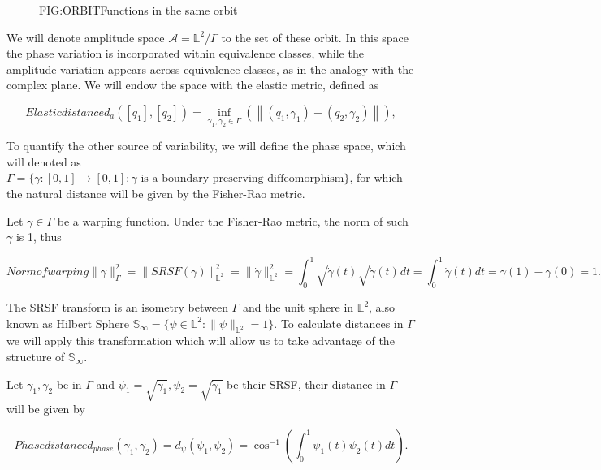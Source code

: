 \begin{figure}[Functions in the same orbit]{FIG:ORBIT}{Functions in the same orbit}
   \quad
\end{figure}

We will denote amplitude space $\mathscr{A}= \mathbb{L}^{2} / \Gamma$  to the
set of these orbit. In this space the phase variation is incorporated within
equivalence classes, while the amplitude variation appears across equivalence
classes, as in the analogy with the complex plane. We will endow the space with
the elastic metric, defined as

\begin{equation}[EQ:ELASTIC]{Elastic distance}
d_{a}\left(\left[q_{1}\right],\left[q_{2}\right]\right)=\inf _{
\gamma_{1}, \gamma_{2} \in {\Gamma}}\left(\left\|\left(q_{1},
 \gamma_{1}\right)-\left(q_{2}, \gamma_{2}\right)\right\|\right),
\end{equation}

To quantify the other source of variability, we will define the phase space,
which will denoted as
$\Gamma = \{\gamma :[0,1] \rightarrow[0,1]  : \gamma \text{ is a boundary-preserving diffeomorphism}\}$,
for which the natural distance will be given by the Fisher-Rao metric.

Let $\gamma \in \Gamma$ be a warping function. Under the Fisher-Rao metric,
the norm of such $\gamma$ is 1, thus

\begin{equation}[]{Norm of warping}
\| \gamma \|_\Gamma^2 = \| SRSF(\gamma)\|_{\mathbb{L}^2}^2 =  \| \dot \gamma\|_{\mathbb{L}^2}^2 =
\int_0^1 \sqrt{\dot \gamma (t)} \sqrt{\dot \gamma (t)}dt =
\int_0^1 \dot \gamma(t)dt = \gamma(1) - \gamma(0) = 1.
\end{equation}

The SRSF transform is an isometry between $\Gamma$ and the unit sphere in
$\mathbb{L}^2$, also known as Hilbert Sphere
$\mathbb{S}_\infty = \{ \psi \in \mathbb{L}^2 : \|\psi\|_{\mathbb{L}^2}=1\}$.
To calculate distances in $\Gamma$ we will apply this transformation which will
allow us to take advantage of the structure of $\mathbb{S}_\infty$.

Let $\gamma_1, \gamma_2$ be in $\Gamma$ and $\psi_1=\sqrt{\dot \gamma_1},
\psi_2=\sqrt{\dot \gamma_1}$ be their SRSF, their distance in $\Gamma$ will be
given by

\begin{equation}[]{Phase distance}
d_{phase}(\gamma_1, \gamma_2) = d_{\psi}(\psi_1, \psi_2) =
\cos^{-1}\left (\int_0^1 \psi_1(t) \psi_2(t) dt\right ).
\end{equation}

